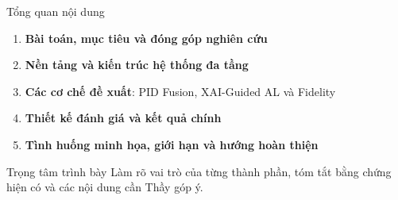 \documentclass[aspectratio=169,10pt]{beamer}
\newcommand{\key}[1]{\textcolor{UETBlue}{\textbf{#1}}}
\begin{document}
\begin{frame}{Tổng quan nội dung}
\begin{enumerate}
  \setlength{\itemsep}{.28cm}
  \item \key{Bài toán, mục tiêu và đóng góp nghiên cứu}
  \item \key{Nền tảng và kiến trúc hệ thống đa tầng}
  \item \key{Các cơ chế đề xuất}: PID Fusion, XAI-Guided AL và Fidelity
  \item \key{Thiết kế đánh giá và kết quả chính}
  \item \key{Tình huống minh họa, giới hạn và hướng hoàn thiện}
\end{enumerate}
\vspace{.18cm}
\begin{block}{Trọng tâm trình bày}
Làm rõ vai trò của từng thành phần, tóm tắt bằng chứng hiện có và các nội dung cần Thầy góp ý.
\end{block}
\end{frame}
\end{document}
